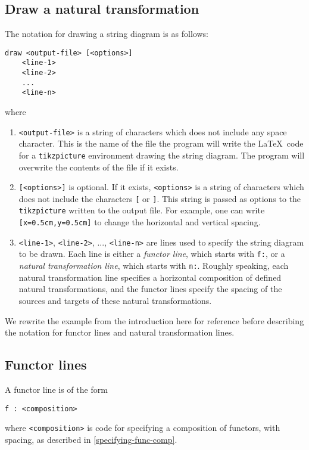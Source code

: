 \documentclass{amsart}
\newcommand{\vlength}{0.2cm}
\begin{document}
\subsection{Draw a natural transformation}
The notation for drawing a string diagram is as follows:
\vspace\vlength
\begin{verbatim}
draw <output-file> [<options>]
    <line-1>
    <line-2>
    ...
    <line-n>
\end{verbatim}
\vspace\vlength
where
\begin{enumerate}
    \item \texttt{<output-file>} is a string of characters which does not include
        any space character.
        This is the name of the file the program will write the \LaTeX\ code
        for a \texttt{tikzpicture} environment drawing the string diagram.
        The program will overwrite the contents of the file if it exists.
    \item \texttt{[<options>]} is optional.
        If it exists, \texttt{<options>} is a string of characters which does not
        include the characters \texttt{[} or \texttt{]}.
        This string is passed as options to the \texttt{tikzpicture}
        written to the output file.
        For example, one can write
        \texttt{[x=0.5cm,y=0.5cm]} to change the horizontal and vertical spacing.
    \item \texttt{<line-1>}, \texttt{<line-2>}, ..., \texttt{<line-n>}
        are lines used to specify the string diagram to be drawn.
        Each line is either a \emph{functor line}, which starts with \texttt{f:},
        or a \emph{natural transformation line}, which starts with \texttt{n:}.
        Roughly speaking, each natural transformation line specifies a horizontal
            composition of defined natural transformations, and the
            functor lines specify the spacing of the sources and targets of these
            natural transformations.
\end{enumerate}
We rewrite the example from the introduction here for reference before describing the
    notation for functor lines and natural transformation lines.
\vspace\vlength

\vspace\vlength

\subsection{Functor lines} A functor line is of the form
\vspace\vlength
\begin{verbatim}
f : <composition>
\end{verbatim}
\vspace\vlength
    where \texttt{<composition>} is code for specifying a composition of functors,
    with spacing, as described in \ref{specifying-func-comp}.
\end{document}
